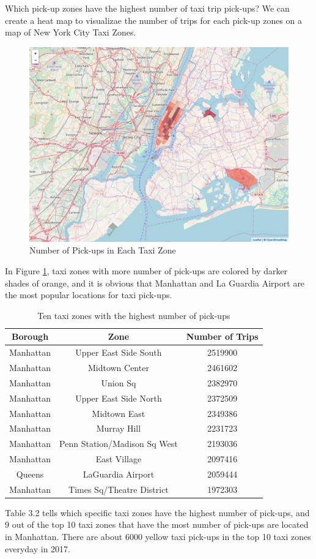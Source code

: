 \documentclass[12pt,twoside]{reedthesis}
\theoremstyle{definition}
\theoremstyle{definition}
\theoremstyle{definition}
\theoremstyle{remark}
\begin{document}
Which pick-up zones have the highest number of taxi trip pick-ups? We
can create a heat map to visualizae the number of trips for each pick-up
zones on a map of New York City Taxi Zones.
\begin{figure}

{\centering \includegraphics[width=5.84in]{figure/num_trip} 

}

\caption{Number of Pick-ups in Each Taxi Zone}\label{fig:num-trip}
\end{figure}
In Figure \ref{fig:num-trip}, taxi zones with more number of pick-ups
are colored by darker shades of orange, and it is obvious that Manhattan
and La Guardia Airport are the most popular locations for taxi pick-ups.
\begin{table}

\caption{\label{tab:unnamed-chunk-42}Ten taxi zones with the highest number of pick-ups}
\centering
\begin{tabular}[t]{ccc}
\toprule
Borough & Zone & Number of Trips\\
\midrule
Manhattan & Upper East Side South & 2519900\\
Manhattan & Midtown Center & 2461602\\
Manhattan & Union Sq & 2382970\\
Manhattan & Upper East Side North & 2372509\\
Manhattan & Midtown East & 2349386\\
\addlinespace
Manhattan & Murray Hill & 2231723\\
Manhattan & Penn Station/Madison Sq West & 2193036\\
Manhattan & East Village & 2097416\\
Queens & LaGuardia Airport & 2059444\\
Manhattan & Times Sq/Theatre District & 1972303\\
\bottomrule
\end{tabular}
\end{table}
Table 3.2 tells which specific taxi zones have the highest number of
pick-ups, and 9 out of the top 10 taxi zones that have the most number
of pick-ups are located in Manhattan. There are about 6000 yellow taxi
pick-ups in the top 10 taxi zones everyday in 2017.
\end{document}

